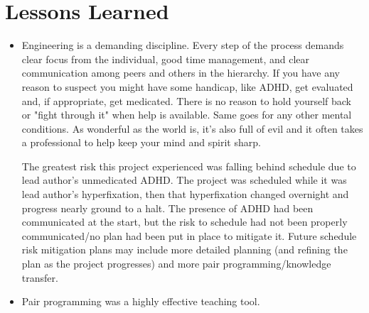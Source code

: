 \section{Lessons Learned}

\begin{itemize}

\item Engineering is a demanding discipline. Every step of the process demands clear focus from the individual, good time management, and clear communication among peers and others in the hierarchy. If you have any reason to suspect you might have some handicap, like ADHD, get evaluated and, if appropriate, get medicated. There is no reason to hold yourself back or "fight through it" when help is available. Same goes for any other mental conditions. As wonderful as the world is, it's also full of evil and it often takes a professional to help keep your mind and spirit sharp. 

The greatest risk this project experienced was falling behind schedule due to lead author's unmedicated ADHD. The project was scheduled while it was lead author's hyperfixation, then that hyperfixation changed overnight and progress nearly ground to a halt. The presence of ADHD had been communicated at the start, but the risk to schedule had not been properly communicated/no plan had been put in place to mitigate it. Future schedule risk mitigation plans may include more detailed planning (and refining the plan as the project progresses) and more pair programming/knowledge transfer.

\item Pair programming was a highly effective teaching tool. 

\end{itemize}
